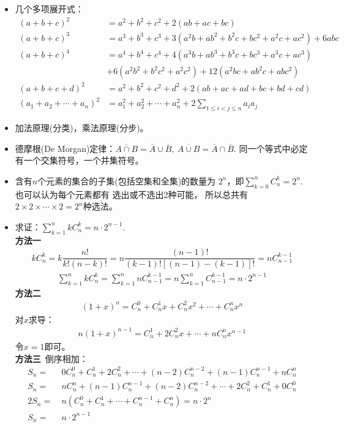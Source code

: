 \begin{itemize}[leftmargin=\inteval{\myitemleftmargin}pt,itemsep=
   \inteval{\myitemitempsep}pt,topsep=\inteval{\myitemtopsep}pt]
\item 几个多项展开式：
\begin{align*}
    (a+b+c)^2 &=a^2+b^2+c^2+2(ab+ac+bc) \\
    (a+b+c)^3 &=a^3+b^3+c^3+3(a^2b+ab^2+b^2c+bc^2+a^2c+ac^2)+6abc \\
    (a+b+c)^4 &=a^4+b^4+c^4+4(a^3b+ab^3+b^3c+bc^3+a^3c+ac^3) \\
    &+6(a^2b^2+b^2c^2+a^2c^2)+12(a^2bc+ab^2c+abc^2) \\
    (a+b+c+d)^2 &=a^2+b^2+c^2+d^2+2(ab+ac+ad+bc+bd+cd) \\
    (a_1+a_2+\cdots+a_n)^2 &=a_1^2+a_2^2+\cdots+a_n^2+
    2\sum_{1\leq i<j\leq n}a_ia_j 
\end{align*}

\item 加法原理(分类)，乘法原理(分步)。

\item 德摩根(De Morgan)定律：$ \overline{A \cap B}=\overline{A}\cup 
\overline{B},\ \overline{A \cup B}=\overline{A}\cap \overline{B} $. 
同一个等式中必定有一个交集符号，一个并集符号。

\item 含有$ n $个元素的集合的子集(包括空集和全集)的数量为
$ 2^n $，即$\sum\limits_{k=0}^{n} C_n^k=2^{n} $. 也可以认为每个元素都有
选出或不选出2种可能，
所以总共有$2\times 2\times \cdots\times 2= 2^n $种选法。

\item 求证：$ \sum\limits_{k=1}^{n} kC_n^k=n\cdot2^{n-1} $. \\
\textbf{方法一} 
\begin{gather*}
    kC_n^k=k\dfrac{n!}{k!(n-k)!}=n\dfrac{(n-1)!}{(k-1)![(n-1)-(k-1)]!}=nC_{n-1}^{k-1} 	
\end{gather*}
\begin{gather*}
    \sum_{k=1}^{n} kC_n^k=\sum_{k=1}^{n} nC_{n-1}^{k-1}=n\sum_{k=1}^{n} C_{n-1}^{k-1}
    =n\cdot 2^{n-1}
\end{gather*}
\textbf{方法二}
\begin{align*}
    (1+x)^n=C_n^0+C_n^1x+C_n^2x^2+\cdots + C_n^nx^n
\end{align*}
对$ x $求导：
\begin{align} \label{二项展开式两边求导}
    n(1+x)^{n-1}=C_n^1+2C_n^2x+\cdots + nC_n^nx^{n-1}
\end{align}
令$ x=1 $即可。\\
\textbf{方法三}\ 倒序相加：
\begin{align*}
    S_n=&\ 0C_n^0+C_n^1+2C_n^2+\cdots+(n-2)C_n^{n-2} +(n-1)C_n^{n-1}+ nC_n^n \\
    S_n=&\ nC_n^n+(n-1)C_n^{n-1}+(n-2)C_n^{n-2}+\cdots+2C_n^2+ C_n^1 +0C_n^0 \\
    2S_n=&\ n(C_n^0+C_n^1+\cdots +C_{n}^{n-1}+C_n^n)=n\cdot 2^n \\
    S_n=&\  n\cdot 2^{n-1}
\end{align*}


\end{itemize}
